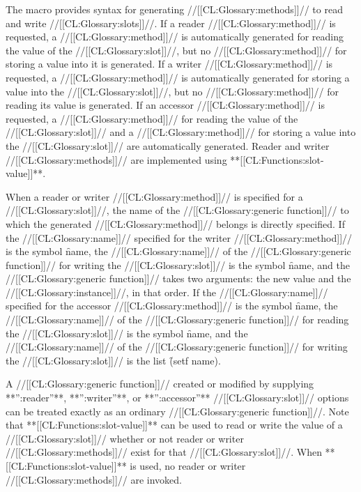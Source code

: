 The macro  provides syntax for generating //[[CL:Glossary:methods]]// to read and write //[[CL:Glossary:slots]]//.  If a reader //[[CL:Glossary:method]]// is requested,  a //[[CL:Glossary:method]]// is automatically generated for reading the value of the //[[CL:Glossary:slot]]//, but no //[[CL:Glossary:method]]// for storing a value into it is generated. If a writer //[[CL:Glossary:method]]// is requested, a //[[CL:Glossary:method]]// is automatically  generated for storing a value into the //[[CL:Glossary:slot]]//, but no //[[CL:Glossary:method]]//  for reading its value is generated.  If an accessor //[[CL:Glossary:method]]// is  requested, a //[[CL:Glossary:method]]// for reading the value of the //[[CL:Glossary:slot]]// and a //[[CL:Glossary:method]]// for storing a value into the //[[CL:Glossary:slot]]// are automatically generated.  Reader and writer //[[CL:Glossary:methods]]// are implemented using **[[CL:Functions:slot-value]]**.

When a reader or writer //[[CL:Glossary:method]]// is specified for a //[[CL:Glossary:slot]]//, the name of the //[[CL:Glossary:generic function]]// to which the generated //[[CL:Glossary:method]]// belongs is directly specified.  If the //[[CL:Glossary:name]]// specified for the writer //[[CL:Glossary:method]]// is the symbol \f{name}, the //[[CL:Glossary:name]]// of the //[[CL:Glossary:generic function]]// for writing the //[[CL:Glossary:slot]]// is the symbol \f{name}, and the //[[CL:Glossary:generic function]]// takes two arguments: the new value and the //[[CL:Glossary:instance]]//, in that order.  If the //[[CL:Glossary:name]]// specified for the accessor //[[CL:Glossary:method]]// is the symbol \f{name}, the //[[CL:Glossary:name]]// of the //[[CL:Glossary:generic function]]// for reading the //[[CL:Glossary:slot]]// is the symbol  \f{name}, and the //[[CL:Glossary:name]]// of the //[[CL:Glossary:generic function]]// for writing  the //[[CL:Glossary:slot]]// is the list \f{(setf name)}.

A //[[CL:Glossary:generic function]]// created or modified by supplying **'':reader''**, **'':writer''**, or **'':accessor''** //[[CL:Glossary:slot]]// options can be treated exactly as an ordinary //[[CL:Glossary:generic function]]//.
            Note that **[[CL:Functions:slot-value]]** can be used to read or write the value of a //[[CL:Glossary:slot]]// whether or not reader or writer //[[CL:Glossary:methods]]// exist for that //[[CL:Glossary:slot]]//.  When **[[CL:Functions:slot-value]]** is used, no reader or writer //[[CL:Glossary:methods]]// are invoked.


